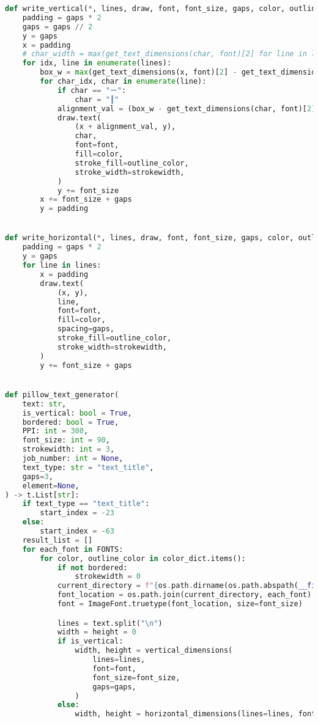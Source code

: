 \begin{lstlisting}[language=Python,caption={Text-ээс PNG зураг үүсгэдэг script},frame=single]
def write_vertical(*, lines, draw, font, font_size, gaps, color, outline_color, strokewidth):
    padding = gaps * 2
    gaps = gaps // 2
    y = gaps
    x = padding
    # char_width = max(get_text_dimensions(char, font)[2] for line in lines for char in line)
    for idx, line in enumerate(lines):
        box_w = max(get_text_dimensions(x, font)[2] - get_text_dimensions(x, font)[0] for x in line)
        for char_idx, char in enumerate(line):
            if char == "ー":
                char = "┃"
            alignment_val = (box_w - get_text_dimensions(char, font)[2]) / 2
            draw.text(
                (x + alignment_val, y),
                char,
                font=font,
                fill=color,
                stroke_fill=outline_color,
                stroke_width=strokewidth,
            )
            y += font_size
        x += font_size + gaps
        y = padding


def write_horizontal(*, lines, draw, font, font_size, gaps, color, outline_color, strokewidth):
    padding = gaps * 2
    y = gaps
    for line in lines:
        x = padding
        draw.text(
            (x, y),
            line,
            font=font,
            fill=color,
            spacing=gaps,
            stroke_fill=outline_color,
            stroke_width=strokewidth,
        )
        y += font_size + gaps


def pillow_text_generator(
    text: str,
    is_vertical: bool = True,
    bordered: bool = True,
    PPI: int = 300,
    font_size: int = 90,
    strokewidth: int = 3,
    job_number: int = None,
    text_type: str = "text_title",
    gaps=3,
    element=None,
) -> t.List[str]:
    if text_type == "text_title":
        start_index = -23
    else:
        start_index = -63
    result_list = []
    for each_font in FONTS:
        for color, outline_color in color_dict.items():
            if not bordered:
                strokewidth = 0
            current_directory = f"{os.path.dirname(os.path.abspath(__file__))}/fonts"
            font_location = os.path.join(current_directory, each_font)
            font = ImageFont.truetype(font_location, size=font_size)

            lines = text.split("\n")
            width = height = 0
            if is_vertical:
                width, height = vertical_dimensions(
                    lines=lines,
                    font=font,
                    font_size=font_size,
                    gaps=gaps,
                )
            else:
                width, height = horizontal_dimensions(lines=lines, font=font, font_size=font_size, gaps=gaps)


\end{lstlisting}
